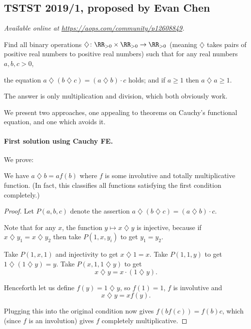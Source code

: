 \documentclass[11pt]{scrartcl}
\begin{document}
\subsection{TSTST 2019/1, proposed by Evan Chen}
\textsl{Available online at \url{https://aops.com/community/p12608849}.}
\begin{mdframed}[style=mdpurplebox,frametitle={Problem statement}]
\def\di{\mathbin{\diamondsuit}}
Find all binary operations $\di \colon \RR_{>0} \times \RR_{>0} \to \RR_{>0}$
(meaning $\di$ takes pairs of
positive real numbers to positive real numbers)
such that for any real numbers $a,b,c > 0$,
\begin{itemize}
  \ii the equation $a \di (b \di c) = (a \di b) \cdot c$ holds; and
  \ii if $a \ge 1$ then $a \di a \ge 1$.
\end{itemize}
\end{mdframed}
\def\di{\mathbin{\diamondsuit}}
The answer is only multiplication and division,
which both obviously work.

We present two approaches,
one appealing to theorems on Cauchy's functional equation,
and one which avoids it.

\paragraph{First solution using Cauchy FE.}
We prove:
\begin{claim*}
  We have $a \di b = a f(b)$ where $f$ is
  some involutive and totally multiplicative function.
  (In fact, this classifies all functions
  satisfying the first condition completely.)
\end{claim*}
\begin{proof}
  Let $P(a,b,c)$ denote the
  assertion $a \di (b \di c) = (a \di b) \cdot c$.
  \begin{itemize}
    \ii Note that for any $x$,
    the function $y \mapsto x \di y$ is injective,
    because if $x \di y_1 = x \di y_2$ then take $P(1, x, y_i)$
    to get $y_1 = y_2$.

    \ii Take $P(1,x,1)$ and injectivity to get $x \di 1 = x$.
    \ii Take $P(1,1,y)$ to get $1 \di (1 \di y) = y$.
    \ii Take $P(x, 1, 1 \di y)$ to get
    \[ x \di y = x \cdot (1 \di y). \]
  \end{itemize}
  Henceforth let us define $f(y) = 1 \di y$, so
  $f(1) = 1$, $f$ is involutive and
  \[ x \di y = xf(y). \]

  Plugging this into the original condition now gives
  $f(bf(c)) = f(b)c$,
  which (since $f$ is an involution)
  gives $f$ completely multiplicative.
\end{proof}
\end{document}

